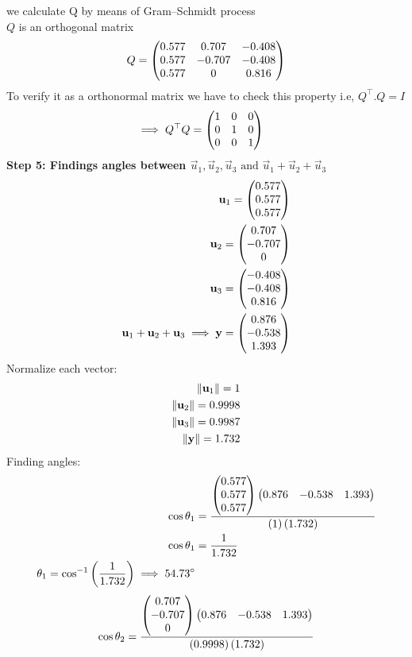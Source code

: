 \documentclass[11pt]{book}
\begin{document}
\begin{enumerate}
we calculate Q by means of Gram–Schmidt process\\
$Q$ is an orthogonal matrix 
\begin{align*}
    Q=\begin{pmatrix} 0.577&0.707&-0.408\\0.577&-0.707&-0.408\\0.577&0&0.816\end{pmatrix}
\end{align*}
To verify it as a orthonormal matrix we have to check this property i.e,  $Q^{\top}.Q =I$
\begin{align*}
    \implies Q^\top Q &= \begin{pmatrix}1&0&0\\0&1&0\\0&0&1\end{pmatrix}
\end{align*}
\textbf{Step 5: Findings angles between $\vec{u}_1,\vec{u}_2,\vec{u}_3  \text{ and } \vec{u}_1+\vec{u}_2+\vec{u}_3 $}
\begin{align}
    \mathbf{u}_1=\begin{pmatrix}0.577\\0.577\\0.577\end{pmatrix}\\
    \mathbf{u}_2=\begin{pmatrix}0.707 \\ -0.707 \\ 0\end{pmatrix} \\
    \mathbf{u}_3=\begin{pmatrix}-0.408\\-0.408\\0.816\end{pmatrix}\\
    \mathbf{u}_1+\mathbf{u}_2+\mathbf{u}_3\implies\mathbf{y}=\begin{pmatrix}0.876\\-0.538\\1.393\end{pmatrix}
\end{align}
Normalize each vector:\\
   \begin{align}
    \left\lVert\mathbf{u}_1\right\rVert=1\\
    \left\lVert\mathbf{u}_2\right\rVert=0.9998\\
     \left\lVert\mathbf{u}_3\right\rVert=0.9987\\
     \left\lVert\mathbf{y}\right\rVert=1.732
   \end{align}
Finding angles:
\begin{align}
    \cos{\theta_1}&=\frac{\begin{pmatrix}0.577 \\0.577 \\0.577\end{pmatrix}\begin{pmatrix}0.876&-0.538&1.393\end{pmatrix}}{\left(1\right)\left(1.732\right)}\\
    \cos{\theta_1}&=\frac{1}{1.732}\\
    \theta_1=\cos^{-1}\left(\frac{1}{1.732}\right)
    \implies 54.73\degree
\end{align}
\begin{align}
   \cos{\theta_2}&=\frac{\myvec{0.707 \\-0.707 \\0}\myvec{0.876&-0.538&1.393}}{\brak{0.9998}\brak{1.732}}\\

\end{align}
\end{enumerate}
\end{document}
